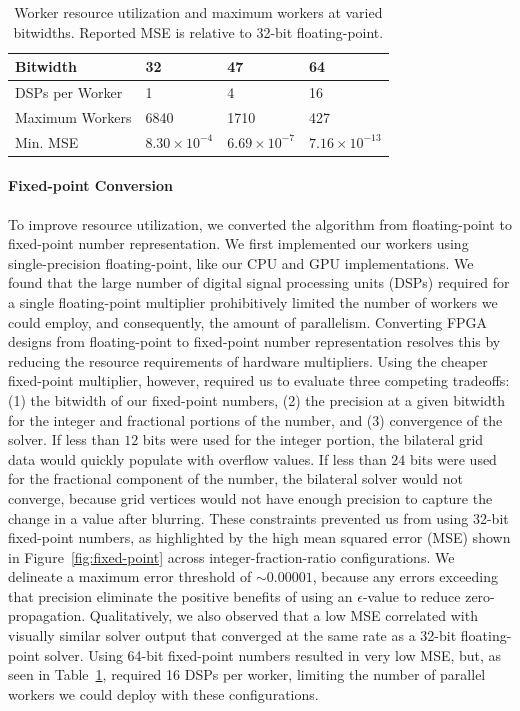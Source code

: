   \begin{table}[h]
		\centering
		\caption{Worker resource utilization and maximum workers at varied bitwidths. Reported MSE is relative to 32-bit floating-point.}

		\begin{tabular}{l|lll}
		\toprule
		Bitwidth        & 32                   & 47                    & 64                   \\ \midrule
		DSPs per Worker & 1                    & 4                     & 16                   \\
		Maximum Workers & 6840                  & 1710                    & 427                   \\
		Min. MSE        & $8.30\times 10^{-4}$ &  $6.69\times 10^{-7}$  & $7.16\times 10^{-13}$ \\ \bottomrule
		\end{tabular}
		\label{table:dsp-workers}


  \end{table}  


\paragraph{Fixed-point Conversion} To improve resource utilization, we converted the algorithm from floating-point to fixed-point number representation.
We first implemented our workers using single-precision floating-point, like our CPU and GPU implementations.
We found that the large number of digital signal processing units (DSPs) required for a single floating-point multiplier prohibitively limited the number of workers we could employ, and consequently, the amount of parallelism.
Converting FPGA designs from floating-point to fixed-point number representation resolves this by reducing the resource requirements of hardware multipliers.
Using the cheaper fixed-point multiplier, however, required us to evaluate three competing tradeoffs: (1) the bitwidth of our fixed-point numbers, (2) the precision at a given bitwidth for the integer and fractional portions of the number, and (3) convergence of the solver.
If less than $12$ bits were used for the integer portion, the bilateral grid data would quickly populate with overflow values.
If less than $24$ bits were used for the fractional component of the number, the bilateral solver would not converge, because grid vertices would not have enough precision to capture the change in a value after blurring.
These constraints prevented us from using 32-bit fixed-point numbers, as highlighted by the high mean squared error (MSE) shown in Figure~\ref{fig:fixed-point} across integer-fraction-ratio configurations. 
We delineate a maximum error threshold of $\sim 0.00001$, because any errors exceeding that precision eliminate the positive benefits of using an $\epsilon$-value to reduce zero-propagation.
Qualitatively, we also observed that a low MSE correlated with visually similar solver output that converged at the same rate as a 32-bit floating-point solver.
Using 64-bit fixed-point numbers resulted in very low MSE, but, as seen in Table~\ref{table:dsp-workers}, required 16 DSPs per worker, limiting the number of parallel workers we could deploy with these configurations. 

